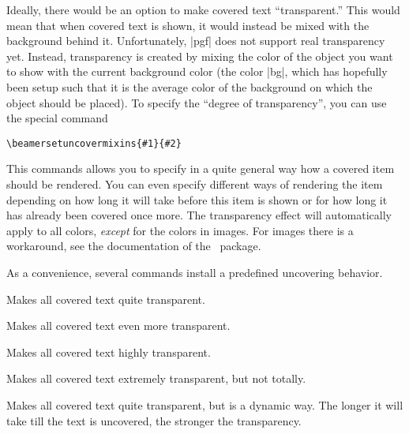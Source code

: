Ideally, there would be an option to make covered text
``transparent.'' This would mean that when covered text is shown, it
would instead be mixed with the background behind it. Unfortunately,
|pgf| does not support real transparency yet. Instead, transparency is
created by mixing the color of the object you want to show with the
current background color (the color |bg|, which has hopefully been
setup such that it is the average color of the background on which the
object should be placed). To specify the ``degree of
transparency'', you can use the special command
\begin{verbatim}
\beamersetuncovermixins{#1}{#2}
\end{verbatim}
This commands allows you to specify in a quite general way how a
covered item should be rendered. You can even specify different ways
of rendering the item depending on how long it will take before this
item is shown or for how long it has already been covered once
more. The transparency effect will automatically apply to all colors,
\emph{except} for the colors in images. For images there is a
workaround, see the documentation of the \pgf\ package. 

As a convenience, several commands install a predefined uncovering
behavior.

\begin{command}{\beamertemplatetransparentcovered}
  Makes all covered text quite transparent. 
\end{command}

\begin{command}{\beamertemplatetransparentcoveredmedium}
  Makes all covered text even more transparent. 
\end{command}

\begin{command}{\beamertemplatetransparentcoveredhigh}
  Makes all covered text highly transparent. 
\end{command}

\begin{command}{\beamertemplatetransparentcoveredhigh}
  Makes all covered text extremely transparent, but not totally. 
\end{command}

\begin{command}{\beamertemplatetransparentcovereddynamic}
  Makes all covered text quite transparent, but is a dynamic way. The
  longer it will take till the text is uncovered, the stronger the
  transparency. 
\end{command}

